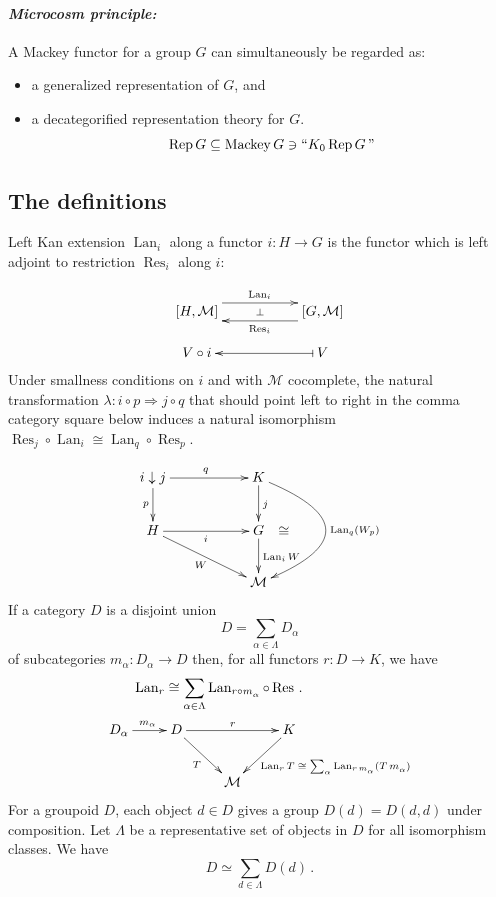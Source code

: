\documentclass[a4paper,12pt]{article}
\theoremstyle{definition}
\theoremstyle{fact}
\theoremstyle{genquest}
\theoremstyle{step}
\newcommand{\Lan}{\operatorname{Lan}}
\newcommand{\funcM}{\mathcal{M}}
\newcommand{\Rep}{\operatorname{Rep}}
\newcommand{\Res}{\operatorname{Res}}
\newcommand{\Implies}{\Longrightarrow}
\begin{document}
\paragraph*{\it Microcosm principle\upshape:\ \ }
A Mackey functor for a group $G$ can simultaneously be regarded as:
%
\begin{itemize}
\item a generalized representation of $G$, and
\item a decategorified representation theory for $G$.
\[
\Rep G \subseteq \operatorname{Mackey} G \ni  ``K_0 \Rep G\,"
\] 
\end{itemize}

\subsection{The definitions\label{Lecture3sub1}}
  
Left Kan extension $\Lan_i$ along a functor $i : H \to G$ is the functor which is left adjoint to restriction $\Res_i$ along $i$:

\vskip-10pt 
\[ \xymatrix @R-3mm {
[H,\funcM] \ar@<1.5ex>[rr]^{\Lan_i} \ar@{}[rr]|-{\perp} && [G,\funcM] \ar@<1.5ex>[ll]^{\Res_i}  \\
V\circ i && \ar@{|->}[ll] V
}\]
Under smallness conditions on $i$ and with $\funcM$ cocomplete, 
the natural transformation $\lambda : i \circ p \Implies j \circ q$ that should point left to right in the comma category square below 
induces a natural isomorphism
$ \Res_j \circ \Lan_i \cong \Lan_q \circ \Res_p $.

\[ \xymatrix{
 i \downarrow j \ar[d]_p\ar[rr]^q &&K \ar[d]^j  \ar@/^4pc/[dd]^{\Lan_q(W_p)}\\
H\ar[rr]_i  \ar[rrd]_{W}  &&G \ar@{}[r]|*{\cong} \ar[d]^{\Lan_i W} &
\\ 
&&\funcM  & 
}
\]
%
If a category $D$ is a disjoint union
\[
D = \sum_{\alpha \in \Lambda} D_\alpha
\]
of subcategories $m_\alpha : D_\alpha \to D$ then, for all functors $r : D \to K$, 
we have %
\begin{align*}
 & \qquad \Lan_r \cong \sum_{\alpha \in \Lambda} \Lan_{r \circ m^{}_\alpha} \circ \Res\,.
\\
 & \xymatrix{
  D_\alpha \ar[r]^{m_\alpha} 
 & D \ar[rr]^r  \ar[rd]_{T}  && K \ar[ld]^-{\Lan_r T \; \cong \; \sum_\alpha  \Lan_{r\,m^{}_\alpha}(T\,m^{}_\alpha)} \\
&& \funcM &}
\end{align*}
For a groupoid $D$, each object $d \in D$ gives a group $D(d)=D(d,d)$ under composition.    
Let $\Lambda$ be a representative set of objects in $D$ for all isomorphism classes.   
We have
\[
D \simeq \sum_{d\in\Lambda} D(d)\,.
\]
\end{document}
